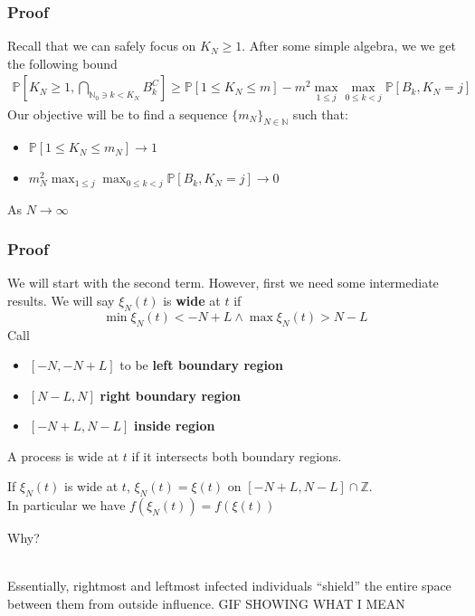 \documentclass{beamer}
\begin{document}
\begin{frame}
    \frametitle{Proof}
    Recall that we can safely focus on $K_N \geq 1$. After some simple algebra, we we get the following bound
    \begin{align*}
        \mathbb{P}\left[ K_N \geq 1,  \bigcap_{\mathbb{N}_0 \ni k < K_N}B_k^C \right]
         \geq  \mathbb{P}[1 \leq K_N \leq m] - m^2\max_{1 \leq j}\max_{0 \leq k < j}\mathbb{P}\left[ B_k, K_{N} = j \right]
    \end{align*}
    Our objective will be to find a sequence $\{m_N\}_{N\in\mathbb{N}}$ such that:
    \begin{itemize}
        \item $\mathbb{P}[1 \leq K_N \leq m_N] \rightarrow 1$
        \item $m_N^2\max_{1 \leq j}\max_{0 \leq k < j}\mathbb{P}\left[ B_k, K_{N} = j \right] \rightarrow 0$ 
    \end{itemize}
    As $N \rightarrow \infty$
\end{frame}

\begin{frame}
    \frametitle{Proof}
    We will start with the second term. However, first we need some intermediate results. We will say $\xi_N(t)$ is \textbf{wide} at $t$ if 
    \[
        \min\xi_N(t) < -N + L \land \max\xi_N(t) > N - L
    \]
    Call \begin{itemize}
        \item $[-N, -N+L]$ to be \textbf{left boundary region}
        \item $[N-L, N]$ \textbf{right boundary region}
        \item $[-N+L, N-L]$ \textbf{inside region}
    \end{itemize}
    A process is wide at $t$ if it intersects both boundary regions.

    \begin{lemma}
        If $\xi_N(t)$ is wide at $t$, $\xi_N(t) = \xi(t)$ on $[-N + L, N - L] \cap \mathbb{Z}$.\\
        In particular we have $f(\xi_N(t)) = f(\xi(t))$
    \end{lemma}


    Why? \\~\\
\end{frame}

\begin{frame}
    Essentially, rightmost and leftmost infected individuals ``shield'' the entire space between them from outside influence.
    GIF SHOWING WHAT I MEAN
\end{frame}
\end{document}
